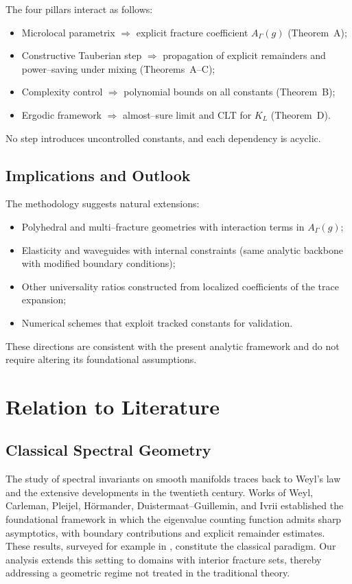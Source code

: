 The four pillars interact as follows:
\begin{itemize}
  \item Microlocal parametrix \(\Rightarrow\) explicit fracture coefficient
  \(A_\Gamma(g)\) (Theorem~A);
  \item Constructive Tauberian step \(\Rightarrow\) propagation of explicit
  remainders and power–saving under mixing (Theorems~A–C);
  \item Complexity control \(\Rightarrow\) polynomial bounds on all constants
  (Theorem~B);
  \item Ergodic framework \(\Rightarrow\) almost–sure limit and CLT for \(K_L\)
  (Theorem~D).
\end{itemize}
No step introduces uncontrolled constants, and each dependency is acyclic.

\subsection{Implications and Outlook}

The methodology suggests natural extensions:
\begin{itemize}
  \item Polyhedral and multi–fracture geometries with interaction terms in
  \(A_\Gamma(g)\);
  \item Elasticity and waveguides with internal constraints (same analytic
  backbone with modified boundary conditions);
  \item Other universality ratios constructed from localized coefficients of the
  trace expansion;
  \item Numerical schemes that exploit tracked constants for validation.
\end{itemize}
These directions are consistent with the present analytic framework and do not
require altering its foundational assumptions.

\section{Relation to Literature}

\subsection{Classical Spectral Geometry}
The study of spectral invariants on smooth manifolds traces back to Weyl's law
and the extensive developments in the twentieth century. Works of Weyl,
Carleman, Pleijel, Hörmander, Duistermaat--Guillemin, and Ivrii established the
foundational framework in which the eigenvalue counting function admits sharp
asymptotics, with boundary contributions and explicit remainder estimates. These
results, surveyed for example in \cite{Ivrii1998, SafarovVassiliev1996},
constitute the classical paradigm. Our analysis extends this setting to domains
with interior fracture sets, thereby addressing a geometric regime not treated
in the traditional theory.

